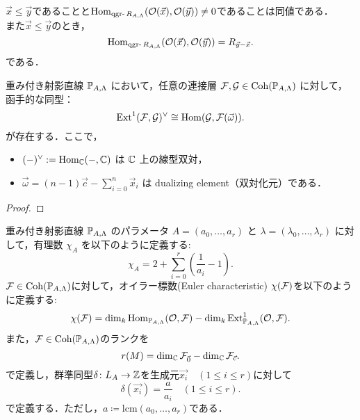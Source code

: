 \begin{prop}\label{lemm:qgr-hom-condition}
	$\vec{x}\le \vec{y}$であることと$\Hom_{\qgr R_{A,\Lambda}}(\mathcal{O}(\vec{x}),\mathcal{O}(\vec{y})) \neq 0$であることは同値である．\\
	また$\vec{x}\le\vec{y}$のとき，
	\[\Hom_{\qgr R_{A,\Lambda}}(\mathcal{O}(\vec{x}),\mathcal{O}(\vec{y}))= R_{\vec{y}- \vec{x}}.\]
	である．
\end{prop}

\begin{thm}\cite{GL87}
	重み付き射影直線 ${\mathbb P}_{A,\Lambda}$ において，任意の連接層 $\mathcal{F}, \mathcal{G} \in \operatorname{\mathrm{Coh}}({\mathbb P}_{A,\Lambda})$ に対して，函手的な同型：
\[
\operatorname{\mathrm{Ext}}^1(\mathcal{F}, \mathcal{G})^\vee \cong \operatorname{\mathrm{Hom}}(\mathcal{G}, \mathcal{F}(\vec{\omega})).
\]
が存在する．ここで，
\begin{itemize}
	\item $(-)^\vee := \operatorname{\mathrm{Hom}}_{{\mathbb C}}(-, {\mathbb C})$ は ${\mathbb C}$ 上の線型双対，
  \item $\vec{\omega} = (n - 1)\vec{c} - \sum_{i=0}^n \vec{x}_i$ は dualizing element（双対化元）である．
\end{itemize}
\end{thm}
\begin{proof}
	
\end{proof}

\begin{defn}
	重み付き射影直線 ${\mathbb P}_{A,\Lambda}$ のパラメータ $A = (a_0, \dots, a_r)$ と $\lambda = (\lambda_0, \dots, \lambda_r)$ に対して，有理数 $\chi_A$ を以下のように定義する:
\[\chi_A = 2 + \sum_{i=0}^{r} \left( \frac{1}{a_i} - 1\right) .\]
${\mathcal F}\in\operatorname{\mathrm{Coh}}({\mathbb P}_{A,\Lambda})$に対して，オイラー標数(Euler characteristic) $\chi({\mathcal F})$を以下のように定義する:
\[ \chi(\mathcal{F}) = \dim_k \operatorname{\mathrm{Hom}}_{{\mathbb P}_{A,\Lambda}}(\mathcal{O}, \mathcal{F}) - \dim_k \operatorname{\mathrm{Ext}}^1_{{\mathbb P}_{A,\Lambda}}(\mathcal{O}, \mathcal{F}) .\]
また，${\mathcal F}\in\operatorname{\mathrm{Coh}}({\mathbb P}_{A,\Lambda})$のランクを
\[r(M) = \dim_{{\mathbb C}} {\mathcal F}_{\vec{0}} - \dim_{{\mathbb C}} {\mathcal F}_{\vec{c}}.\]
 で定義し，群準同型$\delta\colon L_A\to {\mathbb Z}$を生成元$\vec{x_i}\quad (1\le i \le r)$に対して
\[\delta(\vec{x_i}) = \frac{a}{a_i}\quad (1\le i\le r).\]
で定義する．ただし，$a\coloneq \text{lcm}(a_0,\ldots ,a_r)$である．
\end{defn}

